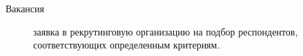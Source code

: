 \Defines %
\begin{description}
\item[Вакансия] заявка в рекрутинговую организацию на подбор респондентов, соответствующих определенным критериям.
\end{description}

